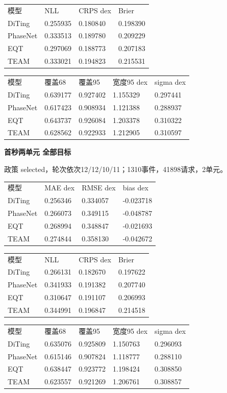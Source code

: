 \documentclass[UTF8,a4paper,11pt]{ctexart}
\begin{document}
\begin{longtable}{llll}
模型 & NLL & CRPS dex & Brier \\
DiTing & 0.255935 & 0.180840 & 0.198390 \\
PhaseNet & 0.333513 & 0.189780 & 0.209229 \\
EQT & 0.297069 & 0.188773 & 0.207183 \\
TEAM & 0.333021 & 0.194823 & 0.215531 \\
\end{longtable}

\begin{longtable}{lllll}
模型 & 覆盖68 & 覆盖95 & 宽度95 dex & sigma dex \\
DiTing & 0.639177 & 0.927402 & 1.155329 & 0.297441 \\
PhaseNet & 0.617423 & 0.908934 & 1.121388 & 0.288937 \\
EQT & 0.643737 & 0.926084 & 1.203378 & 0.310322 \\
TEAM & 0.628562 & 0.922933 & 1.212905 & 0.310597 \\
\end{longtable}


\par\textbf{首秒两单元 全部目标}\par

政策 selected，轮次依次12/12/10/11；1310事件，41898请求，2单元。

\begin{longtable}{llll}
模型 & MAE dex & RMSE dex & bias dex \\
DiTing & 0.256346 & 0.334057 & -0.023718 \\
PhaseNet & 0.266073 & 0.349115 & -0.048787 \\
EQT & 0.268994 & 0.348847 & -0.021693 \\
TEAM & 0.274844 & 0.358130 & -0.042672 \\
\end{longtable}

\begin{longtable}{llll}
模型 & NLL & CRPS dex & Brier \\
DiTing & 0.266131 & 0.182670 & 0.197622 \\
PhaseNet & 0.341933 & 0.191382 & 0.207740 \\
EQT & 0.310647 & 0.191107 & 0.206993 \\
TEAM & 0.344991 & 0.196847 & 0.214518 \\
\end{longtable}

\begin{longtable}{lllll}
模型 & 覆盖68 & 覆盖95 & 宽度95 dex & sigma dex \\
DiTing & 0.635076 & 0.925809 & 1.150763 & 0.296093 \\
PhaseNet & 0.615146 & 0.907824 & 1.118777 & 0.288110 \\
EQT & 0.638447 & 0.923772 & 1.198424 & 0.308850 \\
TEAM & 0.623557 & 0.921269 & 1.206761 & 0.308857 \\
\end{longtable}
\end{document}
